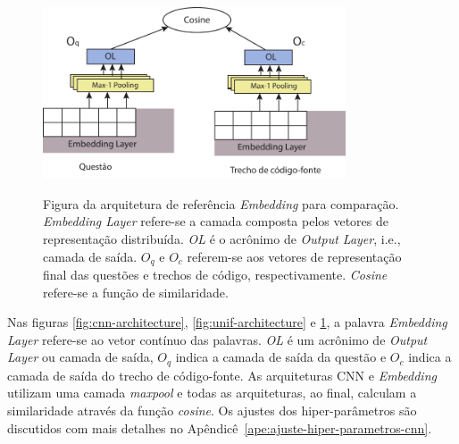 \begin{figure}[h]
    \centering
    \caption[Figura da arquitetura de referência \textit{Embedding} para comparação.]{Figura da arquitetura de referência \textit{Embedding} para comparação. \emph{Embedding Layer} refere-se a camada composta pelos vetores de representação distribuída. \emph{OL} é o acrônimo de \emph{Output Layer}, i.e., camada de saída. $O_{q}$ e $O_{c}$ referem-se aos vetores de representação final das questões e trechos de código, respectivamente. \emph{Cosine} refere-se a função de similaridade. }
    \includegraphics[width=0.8\textwidth]{figuras/cap-experimento/embedding-architecture.pdf}
    \label{fig:embedding-architecture}
\end{figure}
Nas figuras \ref{fig:cnn-architecture}, \ref{fig:unif-architecture} e \ref{fig:embedding-architecture}, a palavra \textit{Embedding Layer} refere-se ao vetor contínuo das palavras. \emph{OL} é um acrônimo de \textit{Output Layer} ou camada de saída, $O_{q}$ indica a camada de saída da questão e $O_{c}$ indica a camada de saída do trecho de código-fonte. As arquiteturas CNN e \textit{Embedding} utilizam uma camada \textit{maxpool} e todas as arquiteturas, ao final, calculam a similaridade através da função \textit{cosine}. Os ajustes dos hiper-parâmetros são discutidos com mais detalhes no Apêndicê~\ref{ape:ajuste-hiper-parametros-cnn}.

